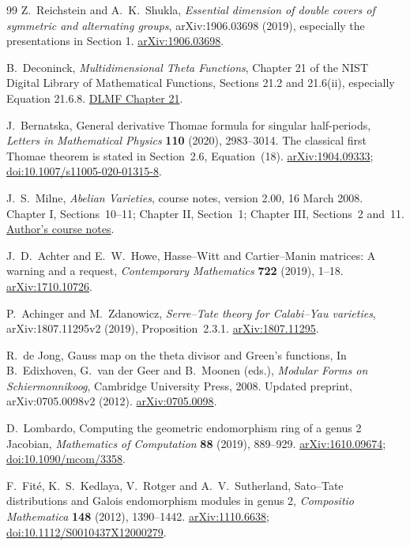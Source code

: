 \documentclass[11pt]{article}
\theoremstyle{definition}
\theoremstyle{remark}
\begin{document}
\begin{thebibliography}{99}
Z.~Reichstein and A.~K.~Shukla,
\emph{Essential dimension of double covers of symmetric and alternating groups},
arXiv:1906.03698 (2019), especially the presentations in Section 1.
\href{https://arxiv.org/abs/1906.03698}{arXiv:1906.03698}.

B.~Deconinck,
\emph{Multidimensional Theta Functions}, Chapter 21 of the NIST Digital
Library of Mathematical Functions, Sections 21.2 and 21.6(ii),
especially Equation 21.6.8.
\href{https://dlmf.nist.gov/21.6}{DLMF Chapter 21}.

J.~Bernatska,
General derivative Thomae formula for singular half-periods,
\emph{Letters in Mathematical Physics} \textbf{110} (2020), 2983--3014.
The classical first Thomae theorem is stated in Section~2.6, Equation~(18).
\href{https://arxiv.org/abs/1904.09333}{arXiv:1904.09333};
\href{https://doi.org/10.1007/s11005-020-01315-8}{doi:10.1007/s11005-020-01315-8}.


J.~S.~Milne,
\emph{Abelian Varieties}, course notes, version 2.00, 16 March 2008.
Chapter I, Sections~10--11; Chapter II, Section~1; Chapter III, Sections~2 and~11.
\href{https://www.jmilne.org/math/CourseNotes/AV.pdf}{Author's course notes}.

J.~D.~Achter and E.~W.~Howe,
Hasse--Witt and Cartier--Manin matrices: A warning and a request,
\emph{Contemporary Mathematics} \textbf{722} (2019), 1--18.
\href{https://arxiv.org/abs/1710.10726}{arXiv:1710.10726}.

P.~Achinger and M.~Zdanowicz,
\emph{Serre--Tate theory for Calabi--Yau varieties},
arXiv:1807.11295v2 (2019), Proposition~2.3.1.
\href{https://arxiv.org/abs/1807.11295}{arXiv:1807.11295}.


R.~de Jong,
Gauss map on the theta divisor and Green's functions,
In B.~Edixhoven, G.~van der Geer and B.~Moonen (eds.),
\emph{Modular Forms on Schiermonnikoog}, Cambridge University Press, 2008.
Updated preprint, arXiv:0705.0098v2 (2012).
\href{https://arxiv.org/abs/0705.0098}{arXiv:0705.0098}.

D.~Lombardo,
Computing the geometric endomorphism ring of a genus 2 Jacobian,
\emph{Mathematics of Computation} \textbf{88} (2019), 889--929.
\href{https://arxiv.org/abs/1610.09674}{arXiv:1610.09674};
\href{https://doi.org/10.1090/mcom/3358}{doi:10.1090/mcom/3358}.


F.~Fit\'e, K.~S.~Kedlaya, V.~Rotger and A.~V.~Sutherland,
Sato--Tate distributions and Galois endomorphism modules in genus 2,
\emph{Compositio Mathematica} \textbf{148} (2012), 1390--1442.
\href{https://arxiv.org/abs/1110.6638}{arXiv:1110.6638};
\href{https://doi.org/10.1112/S0010437X12000279}{doi:10.1112/S0010437X12000279}.



\end{thebibliography}
\end{document}
